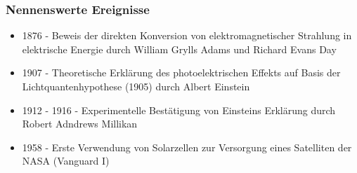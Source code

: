     \subsubsection{Nennenswerte Ereignisse}
        \begin{itemize}
            \item 1876 - Beweis der direkten Konversion von
                elektromagnetischer Strahlung in elektrische Energie durch
                William Grylls Adams und Richard Evans Day
            \item 1907 - Theoretische Erklärung des photoelektrischen Effekts
                auf Basis der Lichtquantenhypothese (1905) durch Albert
                Einstein
            \item 1912 - 1916 - Experimentelle Bestätigung von Einsteins
                Erklärung durch Robert Adndrews Millikan
            \item 1958 - Erste Verwendung von Solarzellen zur Versorgung
                eines Satelliten der NASA (Vanguard I) \cite{Wiki_Vanguard}
        \end{itemize}